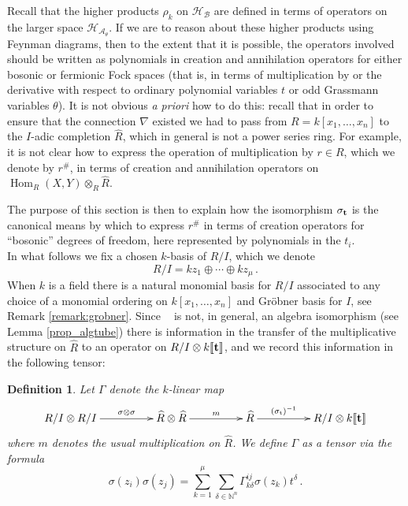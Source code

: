 \documentclass[english,letter paper,12pt,leqno]{article}
\theoremstyle{example}
\newtheorem{definition}[theorem]{Definition}
\numberwithin{equation}{section}
\def\AA{\mathcal{A}}
\def\BB{\mathcal{B}}
\def\HH{\HH}
\def\HH{\mathcal{H}}
\def\Hom{\operatorname{Hom}}
\DeclareMathOperator{\sigmastar}{\sigma_t}
\begin{document}
Recall that the higher products $\rho_k$ on $\HH_{\BB}$ are defined in terms of operators on the larger space $\HH_{\AA_\theta}$. If we are to reason about these higher products using Feynman diagrams, then to the extent that it is possible, the operators involved should be written as polynomials in creation and annihilation operators for either bosonic or fermionic Fock spaces (that is, in terms of multiplication by or the derivative with respect to ordinary polynomial variables $t$ or odd Grassmann variables $\theta$). It is not obvious \emph{a priori} how to do this: recall that in order to ensure that the connection $\nabla$ existed we had to pass from $R = k[x_1,\ldots,x_n]$ to the $I$-adic completion $\widehat{R}$, which in general is not a power series ring. For example, it is not clear how to express the operation of multiplication by $r \in R$, which we denote by $r^{\#}$, in terms of creation and annihilation operators on $\Hom_R(X,Y) \otimes_R \widehat{R}$.

The purpose of this section is then to explain how the isomorphism $\sigma_{\bold{t}}$ is the canonical means by which to express $r^{\#}$ in terms of creation operators for ``bosonic'' degrees of freedom, here represented by polynomials in the $t_i$.
\\

In what follows we fix a chosen $k$-basis of $R/I$, which we denote
\[
R/I = k z_1 \oplus \cdots \oplus k z_\mu\,.
\]
When $k$ is a field there is a natural monomial basis for $R/I$ associated to any choice of a monomial ordering on $k[x_1,\ldots,x_n]$ and Gr\"obner basis for $I$, see Remark \ref{remark:grobner}. Since $\sigmastar$ is not, in general, an algebra isomorphism (see Lemma \ref{prop_algtube}) there is information in the transfer of the multiplicative structure on $\widehat{R}$ to an operator on $R/I \otimes k\llbracket \bold{t} \rrbracket$, and we record this information in the following tensor:

\begin{definition}\label{defn_gamma} Let $\Gamma$ denote the $k$-linear map
\[
\xymatrix@C+2pc{
R/I \otimes R/I \ar[r]^-{ \sigma \otimes \sigma } & \widehat{R} \otimes \widehat{R} \ar[r]^-{m} & \widehat{R} \ar[r]^-{(\sigmastar)^{-1}} & R/I \otimes k\llbracket \bold{t} \rrbracket
}
\]
where $m$ denotes the usual multiplication on $\widehat{R}$. We define $\Gamma$ as a tensor via the formula
\[
\sigma(z_i)\sigma(z_j) = \sum_{k=1}^\mu \sum_{\delta \in \mathbb{N}^n} \Gamma^{ij}_{k \delta} \sigma(z_k) t^\delta\,.
\]
\end{definition}
\end{document}
